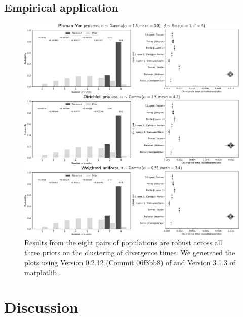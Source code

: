 \documentclass[letterpaper,12pt]{article}
\begin{document}


\subsection{Empirical application}

\begin{figure}[htbp]
    \begin{center}
        \includegraphics[width=\textwidth,height=\textheight,keepaspectratio]{../images/from-project-repo/grid-cyrtodactylus-cropped.pdf}
        \captionsetup{listformat=figList}
        \caption{
            Results from the eight pairs of  populations are
            robust across all three priors on the clustering of divergence
            times.
            We generated the plots using Version 0.2.12 (Commit 06f8bb8) of
            \pycoevolity \citep{Oaks2018ecoevolity} and Version 3.1.3 of
            matplotlib \citep{matplotlib}.
        }
        \label{fig:cyrtresults}
    \end{center}
\end{figure}


\section{Discussion}
\end{document}
